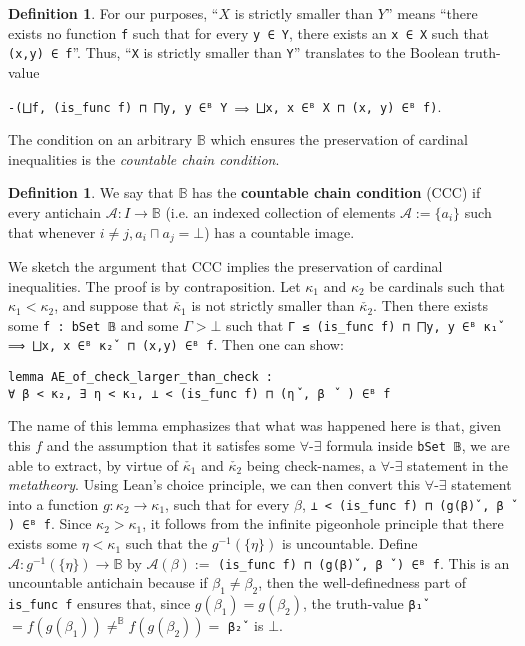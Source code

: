 \documentclass[a4paper,USenglish,cleveref, autoref]{lipics-v2019}
\newcommand{\B}{\mathbb{B}}
\newcommand{\lil}{\lstinline}
\theoremstyle{theorem}
\theoremstyle{definition}
\newtheorem{defn}[definition]{Definition}
\begin{document}
\begin{defn}
  For our purposes, ``$X$ is strictly smaller than $Y$'' means ``there exists no function \lil{f} such that for every \lil{y ∈ Y}, there exists an \lil{x ∈ X} such that \lil{(x,y) ∈ f}''. Thus, ``\lil{X} is strictly smaller than \lil{Y}'' translates to the Boolean truth-value
\begin{center}\lstinline{-(⨆f, (is_func f) ⊓ ⨅y, y ∈ᴮ Y ⟹ ⨆x, x ∈ᴮ X ⊓ (x, y) ∈ᴮ f)}.\end{center}
\end{defn}

The condition on an arbitrary $\B$ which ensures the preservation of cardinal inequalities is the \emph{countable chain condition}.

\begin{defn}
We say that $\B$ has the \textbf{countable chain condition} (CCC) if every antichain $\mathcal{A} : I \to \B$ (i.e. an indexed collection of elements $\mathcal{A} := \{a_i\}$ such that whenever $i \neq j, a_i \sqcap a_j = \bot$) has a countable image.
\end{defn}

We sketch the argument that CCC implies the preservation of cardinal inequalities. The proof is by contraposition. Let $\kappa_1$ and $\kappa_2$ be cardinals such that $\kappa_1 < \kappa_2$, and suppose that $\check{\kappa_1}$ is not strictly smaller than $\check{\kappa_2}$. Then there exists some \lil{f : bSet 𝔹} and some $\Gamma > \bot$ such that \lstinline{Γ ≤ (is_func f) ⊓ ⨅y, y ∈ᴮ κ₁̌  ⟹ ⨆x, x ∈ᴮ κ₂̌  ⊓ (x,y) ∈ᴮ f}. Then one can show:
\begin{lstlisting}
lemma AE_of_check_larger_than_check :
∀ β < κ₂, ∃ η < κ₁, ⊥ < (is_func f) ⊓ (η⠀̌, β ⠀̌ ) ∈ᴮ f
\end{lstlisting}
The name of this lemma emphasizes that what was happened here is that, given this $f$ and the assumption that it satisfes some $\forall$-$\exists$ formula inside \lil{bSet 𝔹}, we are able to extract, by virtue of $\check{\kappa_1}$ and $\check{\kappa_2}$ being check-names, a $\forall$-$\exists$ statement in the \emph{metatheory}. Using Lean's choice principle, we can then convert this $\forall$-$\exists$ statement into a function $g : \kappa_2 \to \kappa_1$, such that for every $\beta$, \lstinline{⊥ < (is_func f) ⊓ (g(β)̌ , β ̌ ) ∈ᴮ f}. Since $\kappa_2 > \kappa_1$, it follows from the infinite pigeonhole principle that there exists some $\eta < \kappa_1$ such that the $g^{-1}(\{\eta\})$ is uncountable. Define $\mathcal{A} : g^{-1}(\{\eta\}) \to \B$ by $\mathcal{A}(\beta) :=$ \lil{(is_func f) ⊓ (g(β)̌ , β ̌ ) ∈ᴮ f}. This is an uncountable antichain because if $\beta_1 \neq \beta_2$, then the well-definedness part of \lil{is_func f} ensures that, since $g(\beta_1) = g(\beta_2)$, the truth-value \lil{β₁̌ } $= f(g(\beta_1)) \neq^\B f(g(\beta_2)) =$ \lil{β₂̌ } is $\bot$.
\end{document}
